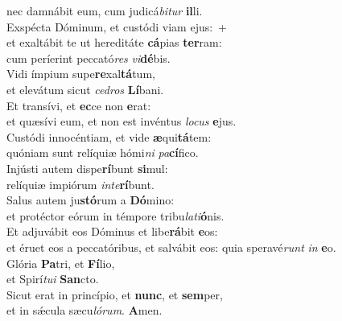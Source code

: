 \oddverse nec damnábit eum, cum judicá\textit{bi}\textit{tur} \textbf{il}li.\\
\evenverse Exspécta Dóminum, et custódi viam ejus:~+\\
\evenverse  et exaltábit te ut hereditáte \textbf{cá}pias \textbf{ter}ram:~\*\\
\evenverse cum períerint peccató\textit{res} \textit{vi}\textbf{dé}bis.\\
\oddverse Vidi ímpium supe\textbf{re}xal\textbf{tá}tum,~\*\\
\oddverse et elevátum sicut \textit{ce}\textit{dros} \textbf{Lí}bani.\\
\evenverse Et transívi, et \textbf{ec}ce non \textbf{e}rat:~\*\\
\evenverse et quæsívi eum, et non est invéntus \textit{lo}\textit{cus} \textbf{e}jus.\\
\oddverse Custódi innocéntiam, et vide \textbf{æ}qui\textbf{tá}tem:~\*\\
\oddverse quóniam sunt relíquiæ hómi\textit{ni} \textit{pa}\textbf{cí}fico.\\
\evenverse Injústi autem dispe\textbf{rí}bunt \textbf{si}mul:~\*\\
\evenverse relíquiæ impiórum \textit{in}\textit{te}\textbf{rí}bunt.\\
\oddverse Salus autem ju\textbf{stó}rum a \textbf{Dó}mino:~\*\\
\oddverse et protéctor eórum in témpore tribu\textit{la}\textit{ti}\textbf{ó}nis.\\
\evenverse Et adjuvábit eos Dóminus et libe\textbf{rá}bit \textbf{e}os:~\*\\
\evenverse et éruet eos a peccatóribus, et salvábit eos: quia speravé\textit{runt} \textit{in} \textbf{e}o.\\
\oddverse Glória \textbf{Pa}tri, et \textbf{Fí}lio,~\*\\
\oddverse et Spirí\textit{tu}\textit{i} \textbf{San}cto.\\
\evenverse Sicut erat in princípio, et \textbf{nunc}, et \textbf{sem}per,~\*\\
\evenverse et in sǽcula sæcu\textit{ló}\textit{rum}. \textbf{A}men.\\
